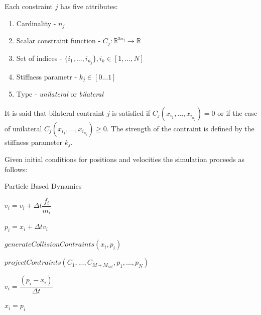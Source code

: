 \documentclass[en]{minipw} %
\begin{document}
Each constraint $j$ has five attributes:

\begin{enumerate}
\item Cardinality - $n_j$
\item Scalar constraint function - $C_j : \mathbb{R}^{3n_j} \rightarrow \mathbb{R}$
\item Set of indices - $\{i_1, ..., i_{n_{j}}\}, i_k \in [1, ..., N]$
\item Stiffness parametr - $k_j \in [0 ... 1]$
\item Type - \textit{unilateral} or \textit{bilateral}
\end{enumerate}

It is said that bilateral contraint $j$ is satisfied if $C_j(x_{i_{1}}, ..., x_{i_{n_{j}}}) = 0$ or if the case of unilateral $C_j(x_{i_{1}}, ..., x_{i_{n_{j}}}) \geq 0$. The strength of the contraint is defined by the stiffness parameter $k_j$.

Given initial conditions for positions and velocities the simulation proceeds as follows:


\begin{algorithm}
\caption{Particle Based Dynamics}\label{euclid}
\begin{algorithmic}[1]

\label{alg:pbd:main_loop}

\label{alg:pdb:explicit_for}

\State $v_{i} = v_{i} + \Delta t \dfrac{f_i}{m_i}$
\label{alg:pdb:explicit_v}

\State $p_{i} = x_{i} + \Delta t v_i$
\label{alg:pdb:explicit_p}

\State $generateCollisionContraints(x_i, p_i)$
\label{alg:pdb:generate_collision_contraints}

\EndFor

\label{alg:pdb:iter_while}

\State $projectContraints(C_1, ..., C_{M + M_{ext}}, p_1, ..., p_N)$
\label{alg:pdb:project_contraints}

\EndWhile

\State $v_{i} = \dfrac{(p_i - x_i)}{\Delta t} $
\label{alg:pdb:implicit_v}

\State $x_{i} = p_{i}$
\label{alg:pdb:implicit_x}

\EndFor

\EndWhile

\EndProcedure
\end{algorithmic}
\end{algorithm}
\end{document}
